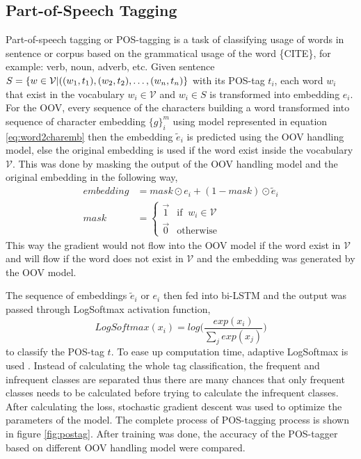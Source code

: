     \subsection{Part-of-Speech Tagging}
        Part-of-speech tagging or POS-tagging is a task of classifying
        usage of words in sentence or corpus based on the grammatical
        usage of the word \{CITE\}, for example: verb, noun, adverb,
        etc. Given sentence $S = \{w \in \mathcal{V} \vert ((w_1,
        t_1), (w_2, t_2)\\, \dots, (w_n, t_n)\}$ with its POS-tag
        $t_i$, each word $w_i$ that exist in the vocabulary $w_i \in
        \mathcal{V}$ and $w_i \in S$ is transformed into embedding
        $e_i$. For the OOV, every sequence of the characters building
        a word transformed into sequence of character embedding
        $\{g\}_{i}^m$ using model represented in equation
        \ref{eq:word2charemb} then the embedding $\tilde{e}_i$ is
        predicted using the OOV handling model, else the original
        embedding is used if the word exist inside the vocabulary
        $\mathcal{V}$. This was done by masking the output of the OOV
        handling model and the original embedding in the following
        way,
        \begin{align}
            \label{eq:embeddingmask}
            embedding &= mask \odot e_i + (1-mask) \odot \tilde{e}_i\\
            mask &=
            \begin{cases}
                \vec{1} & \text{if }\ w_i \in \mathcal{V}\\
                \vec{0} & \text{otherwise}
            \end{cases}
        \end{align}        
        This way the gradient would not flow into the OOV model if the
        word exist in $\mathcal{V}$ and will flow if the word does not
        exist in $\mathcal{V}$ and the embedding was generated by the
        OOV model.

        The sequence of embeddings $\tilde{e}_i$ or $e_i$ then fed
        into bi-LSTM and the output was passed through LogSoftmax
        activation function,
        \begin{equation}
            \label{eq:logsoftmax}
            LogSoftmax(x_i) = log \Bigg(\frac{exp(x_i)}{\sum_j exp(x_j)}\Bigg)
        \end{equation}
        to classify the POS-tag $t$. To ease up computation time,
        adaptive LogSoftmax is used \citep{grave2018efficientsoftmax}.
        Instead of calculating the whole tag classification, the
        frequent and infrequent classes are separated thus there are
        many chances that only frequent classes needs to be calculated
        before trying to calculate the infrequent classes. After
        calculating the loss, stochastic gradient descent was used to
        optimize the parameters of the model. The complete process of
        POS-tagging process is shown in figure \ref{fig:postag}. After
        training was done, the accuracy of the POS-tagger based on
        different OOV handling model were compared.

